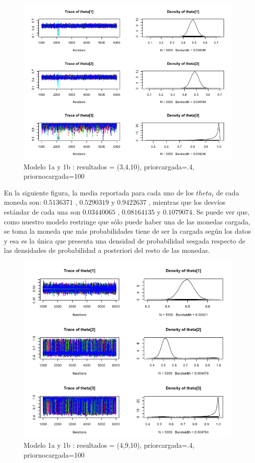 \documentclass[a4paper]{article}
\begin{document}
\begin{figure}[h!]
\centering
\includegraphics[scale=0.5] {img1.png}
\caption{Modelo 1a y 1b : resultados = (3,4,10), priorcargada=.4, priornocargada=100 }
\end{figure}

En la siguiente figura, la media reportada para cada uno de los $theta_i$ de cada moneda son:
$0.5136371$ , $0.5290319$ y $0.9422637$ , mientras que los desvíos estándar de cada una son
$0.03440065$ , $0.08164135$ y $0.1079074$. Se puede ver que, como nuestro modelo restringe que
sólo puede haber una de las monedas cargada, se toma la moneda que más probabilidades tiene de
ser la cargada según los datos y esa es la única que presenta una densidad de probabilidad 
sesgada respecto de las densidades de probabilidad a posteriori del resto de las monedas.

\begin{figure}[h!]
\centering
\includegraphics[scale=0.5] {img2.png}
\caption{Modelo 1a y 1b : resultados = (4,9,10), priorcargada=.4, priornocargada=100 }
\end{figure}
\end{document}
